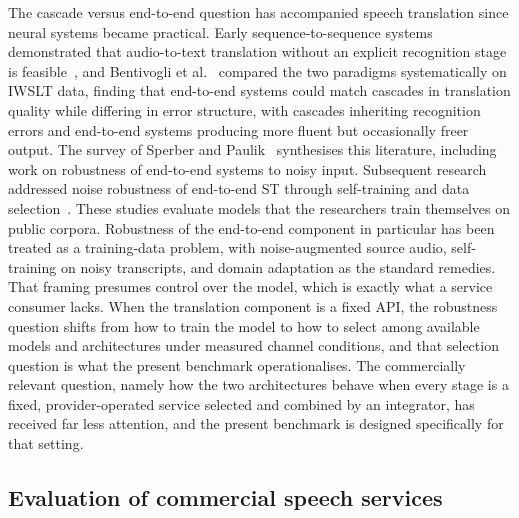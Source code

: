 The cascade versus end-to-end question has accompanied speech translation
since neural systems became practical. Early sequence-to-sequence systems
demonstrated that audio-to-text translation without an explicit recognition
stage is feasible~\citep{berard2016listen,weiss2017sequence}, and
Bentivogli et al.~\citep{bentivogli2021cascade} compared the two paradigms
systematically on IWSLT data, finding that end-to-end systems could match
cascades in translation quality while differing in error structure, with
cascades inheriting recognition errors and end-to-end systems producing more
fluent but occasionally freer output. The survey of Sperber and
Paulik~\citep{sperber2020speech} synthesises this literature, including work on
robustness of end-to-end systems to noisy input. Subsequent research
addressed noise robustness of end-to-end ST through self-training and data
selection~\citep{pino20_interspeech}. These studies evaluate models that the
researchers train themselves on public corpora. Robustness of the end-to-end component in
particular has been treated as a training-data problem, with noise-augmented
source audio, self-training on noisy transcripts, and domain adaptation as
the standard remedies. That framing presumes control over the model, which
is exactly what a service consumer lacks. When the translation component is
a fixed API, the robustness question shifts from how to train the model to
how to select among available models and architectures under measured
channel conditions, and that selection question is what the present
benchmark operationalises. The commercially relevant
question, namely how the two architectures behave when every stage is a
fixed, provider-operated service selected and combined by an integrator, has
received far less attention, and the present benchmark is designed
specifically for that setting.

\subsection{Evaluation of commercial speech services}


